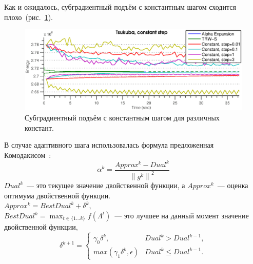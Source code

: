 \documentclass{article}
\begin{document}
Как и ожидалось, субградиентный подъём с константным шагом сходится плохо~(рис.~\ref{fig:constant_subgradient}).\\
\begin{figure}
    \centering
    \includegraphics[width=\textwidth]{constant_subgradient_tsukuba.eps}
    \caption{Субградиентный подъём с константным шагом для различных констант.}
    \label{fig:constant_subgradient}
\end{figure}
В случае адаптивного шага использовалась формула предложенная Комодакисом~\cite{SubgradientWeights}:\\
\begin{equation}
\alpha^k = \frac{Approx^k - Dual^k}{\left \| g^k \right \|^2}
\end{equation}
$Dual^k$~--- это текущее значение двойственной функции, а $Approx^k$~--- оценка оптимума двойственной функции.\\
$Approx^k = BestDual^k + \delta^k$,\\
$BestDual^k = \max_{t \in \{1 \dots k\}} f(\Lambda^t)$~--- это лучшее на данный момент значение двойственной функции,\\
\begin{equation}
    \delta^{k+1} = \begin{cases}
    \gamma_0 \delta^k, & Dual^k > Dual^{k-1},\\
    max(\gamma_1 \delta^k, \epsilon) & Dual^k \leqslant  Dual^{k-1}.
    \end{cases}
\end{equation}
\end{document}
